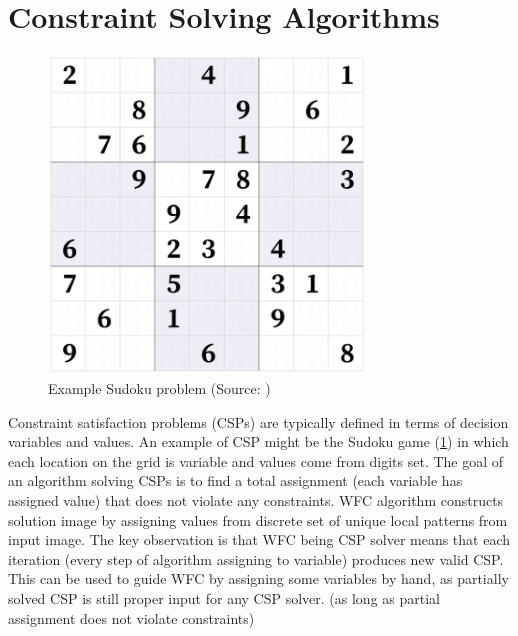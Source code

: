 \documentclass[shortabstract, english, inz]{iithesis}
\begin{document}
\section{Constraint Solving Algorithms}
\begin{figure}[H]
\centering
\includegraphics[width=0.75\textwidth, angle=0]{images/sudoku.png}
\caption{Example Sudoku problem (Source: \cite{sudoku})}
\label{fig:sudoku}
\end{figure}
Constraint satisfaction problems (CSPs) are typically defined in terms of decision variables and values. An example of CSP might be the Sudoku game (\ref{fig:sudoku}) in which each location on the grid is variable and values come from digits set. The goal of an algorithm solving CSPs is to find a total assignment (each variable has assigned value) that does not violate any constraints. \fmlinebreak
WFC algorithm constructs solution image by assigning values from discrete set of unique local patterns from input image. \cite{Smith} The key observation is that WFC being CSP solver means that each iteration (every step of algorithm assigning to variable) produces new valid CSP. This can be used to guide WFC by assigning some variables by hand, as partially solved CSP is still proper input for any CSP solver. (as long as partial assignment does not violate constraints)
\end{document}
